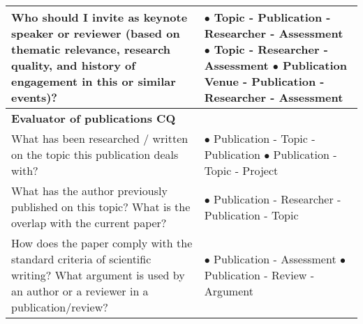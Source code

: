 \begin{table}[]
\begin{tabular}{|p{6cm}|p{6cm}|}
Who should I invite as keynote speaker or reviewer (based on thematic relevance, research quality, and history of engagement in this or similar events)?       & $\bullet$ Topic - Publication - Researcher - \newline Assessment \newline $\bullet$ Topic - Researcher - Assessment \newline $\bullet$ Publication Venue - Publication - \newline Researcher - Assessment       \\ \hline
\multicolumn{2}{|l|}{\textbf{Evaluator of publications CQ}}                                                                                                                                                                                                                                            \\ \hline
What has been researched / written on the topic this publication deals with?                                       & $\bullet$ Publication - Topic - Publication \newline $\bullet$ Publication - Topic - Project                                                                               \\ \hline
What has the author previously published on this topic? What is the overlap with the current paper?                                                   & $\bullet$ Publication - Researcher - Publication - Topic                                                                                                 \\ \hline
How does the paper comply with the standard criteria of scientific writing?  
What argument is used by an author or a reviewer in a publication/review? & $\bullet$ Publication - Assessment\newline
$\bullet$ Publication - Review - Argument


\end{tabular}
\end{table}

